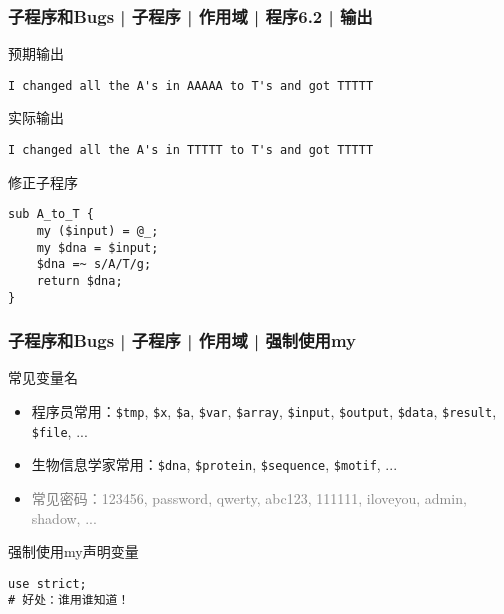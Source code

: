 \begin{frame}[fragile]
  \frametitle{子程序和Bugs | 子程序 | 作用域 | 程序6.2 | 输出}
  \begin{block}{预期输出}
\begin{lstlisting}[basicstyle=\footnotesize\tt]
I changed all the A's in AAAAA to T's and got TTTTT 
\end{lstlisting}
  \end{block}
  \vspace{-0.3em}
  \pause
  \begin{block}{实际输出}
\begin{lstlisting}[basicstyle=\footnotesize\tt]
I changed all the A's in TTTTT to T's and got TTTTT 
\end{lstlisting}
  \end{block}
  \vspace{-0.3em}
  \pause
  \begin{block}{修正子程序}
\begin{lstlisting}[basicstyle=\small\tt]
sub A_to_T {
    my ($input) = @_;
    my $dna = $input;
    $dna =~ s/A/T/g;
    return $dna;
}
\end{lstlisting}
  \end{block}
\end{frame}

\begin{frame}[fragile]
  \frametitle{子程序和Bugs | 子程序 | 作用域 | 强制使用my}
  \begin{block}{常见变量名}
    \begin{itemize}
      \item 程序员常用：\verb|$tmp|, \verb|$x|, \verb|$a|, \verb|$var|, \verb|$array|, \verb|$input|, \verb|$output|, \verb|$data|, \verb|$result|, \verb|$file|, ...
      \item 生物信息学家常用：\verb|$dna|, \verb|$protein|, \verb|$sequence|, \verb|$motif|, ...
      \item \textcolor{gray}{常见密码：123456, password, qwerty, abc123, 111111, iloveyou, admin, shadow, ...}
    \end{itemize}
  \end{block}
  \pause
  \begin{block}{强制使用my声明变量}
\begin{lstlisting}
use strict;
# 好处：谁用谁知道！
\end{lstlisting}
  \end{block}
\end{frame}

